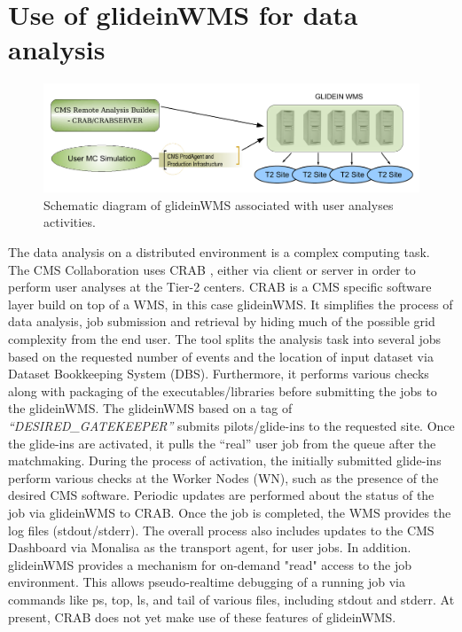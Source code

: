 \documentclass[a4paper]{jpconf}
\begin{document}
\section{Use of glideinWMS for data analysis}
\begin{figure}
\begin{center}
\includegraphics[scale=0.4]{user_analysis}
\end{center}
\caption{Schematic diagram of glideinWMS associated with user analyses activities.}
\label{fig:user_analysis}
\end{figure}
The data analysis on a distributed environment is a complex computing task. The CMS Collaboration
uses CRAB \cite{bib:cms_crab}, either via client or server in order to perform user analyses at the Tier-2 centers.
CRAB is a CMS specific software layer build on top of a WMS, in this case glideinWMS. It simplifies the process 
of data analysis, job submission and retrieval by hiding much of the possible grid complexity from the
end user. The tool splits the analysis task into several jobs based on the requested number of events and
the location of input dataset via Dataset Bookkeeping System (DBS). Furthermore, it performs various checks along with 
packaging of the executables/libraries before submitting the jobs to the glideinWMS. The glideinWMS based 
on a tag of \emph{``DESIRED\_GATEKEEPER''} submits pilots/glide-ins to the requested site. Once the glide-ins are activated, 
it pulls the ``real'' user job from the queue after the matchmaking. During the process of activation, the 
initially submitted glide-ins perform various checks at the Worker Nodes (WN), such as the presence of the desired 
CMS software. Periodic updates are performed about the status of the job via glideinWMS to CRAB. Once the 
job is completed, the WMS provides the log files (stdout/stderr). The overall process also includes updates 
to the CMS Dashboard via Monalisa as the transport agent, for user jobs.
In addition. glideinWMS provides a mechanism for on-demand "read" access to the job environment. This allows
pseudo-realtime debugging of a running job via commands like ps, top, ls, and tail of various files, including stdout and stderr. 
At present, CRAB does not yet make use of these features of glideinWMS.
\end{document}

